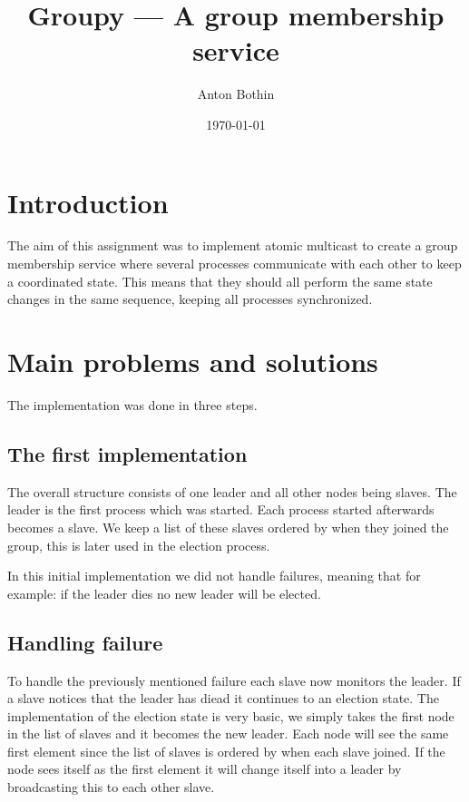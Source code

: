 \documentclass[a4paper, 11pt]{article}
\title{Groupy --- A group membership service}
\author{Anton Bothin}
\date{\today{}}
\begin{document}
\maketitle

\section{Introduction}

The aim of this assignment was to implement atomic multicast to create a group membership service where several processes communicate with each other to keep a coordinated state. This means that they should all perform the same state changes in the same sequence, keeping all processes synchronized.

\section{Main problems and solutions}

The implementation was done in three steps.

\subsection{The first implementation}

The overall structure consists of one leader and all other nodes being slaves. The leader is the first process which was started. Each process started afterwards becomes a slave. We keep a list of these slaves ordered by when they joined the group, this is later used in the election process.

In this initial implementation we did not handle failures, meaning that for example: if the leader dies no new leader will be elected.

\subsection{Handling failure}

To handle the previously mentioned failure each slave now monitors the leader. If a slave notices that the leader has diead it continues to an election state. The implementation of the election state is very basic, we simply takes the first node in the list of slaves and it becomes the new leader. Each node will see the same first element since the list of slaves is ordered by when each slave joined. If the node sees itself as the first element it will change itself into a leader by broadcasting this to each other slave.
\end{document}
